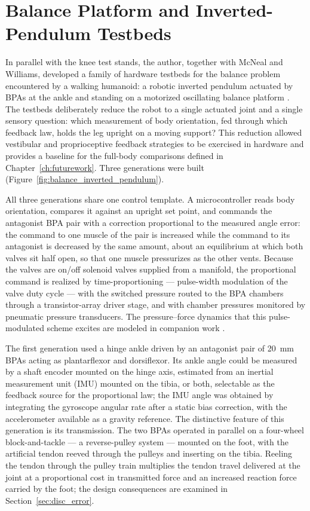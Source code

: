 \section{Balance Platform and Inverted-Pendulum Testbeds}\label{sec:balance_testbeds}

In parallel with the knee test stands, the author, together with McNeal and Williams, developed a family of hardware testbeds for the balance problem encountered by a walking humanoid: a robotic inverted pendulum actuated by BPAs at the ankle and standing on a motorized oscillating balance platform \citep{bolen_balance_2024, bolen_selfbalancing_2024, bolen_selfbalancing_srs_2024}. The testbeds deliberately reduce the robot to a single actuated joint and a single sensory question: which measurement of body orientation, fed through which feedback law, holds the leg upright on a moving support? This reduction allowed vestibular and proprioceptive feedback strategies to be exercised in hardware and provides a baseline for the full-body comparisons defined in Chapter~\ref{ch:futurework}. Three generations were built (Figure~\ref{fig:balance_inverted_pendulum}).

All three generations share one control template. A microcontroller reads body orientation, compares it against an upright set point, and commands the antagonist BPA pair with a correction proportional to the measured angle error: the command to one muscle of the pair is increased while the command to its antagonist is decreased by the same amount, about an equilibrium at which both valves sit half open, so that one muscle pressurizes as the other vents. Because the valves are on/off solenoid valves supplied from a manifold, the proportional command is realized by time-proportioning --- pulse-width modulation of the valve duty cycle --- with the switched pressure routed to the BPA chambers through a transistor-array driver stage, and with chamber pressures monitored by pneumatic pressure transducers. The pressure--force dynamics that this pulse-modulated scheme excites are modeled in companion work \citep{elzein_pressure_2025}.

The first generation used a hinge ankle driven by an antagonist pair of \qty{20}{\mm} BPAs acting as plantarflexor and dorsiflexor. Its ankle angle could be measured by a shaft encoder mounted on the hinge axis, estimated from an inertial measurement unit (IMU) mounted on the tibia, or both, selectable as the feedback source for the proportional law; the IMU angle was obtained by integrating the gyroscope angular rate after a static bias correction, with the accelerometer available as a gravity reference. The distinctive feature of this generation is its transmission. The two BPAs operated in parallel on a four-wheel block-and-tackle --- a reverse-pulley system --- mounted on the foot, with the artificial tendon reeved through the pulleys and inserting on the tibia. Reeling the tendon through the pulley train multiplies the tendon travel delivered at the joint at a proportional cost in transmitted force and an increased reaction force carried by the foot; the design consequences are examined in Section~\ref{sec:disc_error}.

